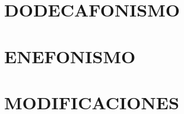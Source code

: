 \documentclass[twoside]{book}
\begin{document}
	
    
    
	
	
    \part{DODECAFONISMO}
    
	
    
	\part{ENEFONISMO}%
    
    
    \part{MODIFICACIONES}
	
	
    
    
    
	\cleardoublepage
    
	

	\cleardoublepage
    
\end{document}
